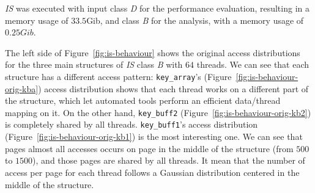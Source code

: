 \emph{IS} was executed with input class \emph{D} for the performance
evaluation, resulting in a memory usage of $33.5$Gib, and class \emph{B} for
the analysis, with a memory usage of $0.25Gib$.

\begin{figure*}[htb]
    \centering


    \caption{Memory access distribution for the main structures of
        \emph{IS} with $64$ threads. Original behavior on the top, modified on
    the bottom.}
    \label{fig:is-behaviour}

\end{figure*}

The left side of Figure~\ref{fig:is-behaviour} shows the original access distributions for the
three main structures of \emph{IS} class \emph{B} with $64$ threads. We can see that
each structure has a different access pattern: \texttt{key\_array}'s
(Figure~\ref{fig:is-behaviour-orig-kba}) access distribution shows that each
thread works on a different part of the structure, which let automated
tools perform an efficient data/thread mapping on it. On the other hand, \texttt{key\_buff2}
(Figure~\ref{fig:is-behaviour-orig-kb2}) is completely shared by all threads.
\texttt{key\_buff1}'s access distribution (Figure~\ref{fig:is-behaviour-orig-kb1})
is the most interesting one. We can see that pages almost all accesses occurs
on page in the middle of the structure (from $500$ to $1500$), and those pages
are shared by all threads. It mean that the number of access per page  for
each thread follows a Gaussian distribution centered in the middle of the
structure.

